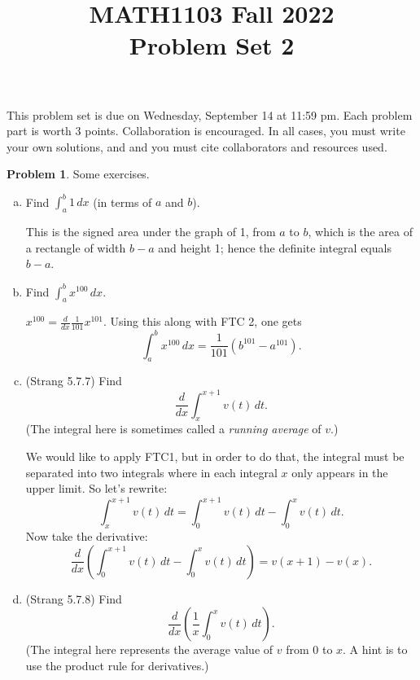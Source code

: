 \documentclass[11pt,oneside]{amsart}
\title{MATH1103 Fall 2022\\
Problem Set 2}
\theoremstyle{definition}
\newtheorem{problem}{Problem}
\begin{document}
    \maketitle
    This problem set is due on Wednesday, September 14 at 11:59 pm. Each problem part is worth 3 points. Collaboration is encouraged. In all cases, you must write your own solutions, and and you must cite collaborators and resources used.

    \begin{problem}
        Some exercises.
        \begin{enumerate}[(a)]
            \item Find $\int_a^b 1\,dx$ (in terms of $a$ and $b$).
            \begin{solution}
                This is the signed area under the graph of 1, from $a$ to $b$, which is the area of a rectangle of width $b-a$ and height 1; hence the definite integral equals $b-a$.
            \end{solution}
            \item Find $\int_a^b x^{100}\,dx$.
            \begin{solution}
                $x^{100}=\frac{d}{dx}\frac1{101}x^{101}$. Using this along with FTC 2, one gets
                \[\int_a^b x^{100}\,dx=\frac 1{101}(b^{101}-a^{101}).\]
            \end{solution}
            \item (Strang 5.7.7) Find
            \[\frac d{dx}\int_x^{x+1}v(t)\,dt.\]
            (The integral here is sometimes called a \emph{running average} of $v$.)
            \begin{solution}
                We would like to apply FTC1, but in order to do that, the integral must be separated into two integrals where in each integral $x$ only appears in the upper limit. So let's rewrite:
                \[
                    \int_x^{x+1}v(t)\,dt = \int_0^{x+1}v(t)\,dt -\int_0^x v(t)\,dt.
                \]
                Now take the derivative:
                \[\frac d{dx}\left(\int_0^{x+1}v(t)\,dt -\int_0^x v(t)\,dt\right)=v(x+1)-v(x).\]
            \end{solution}
            \item (Strang 5.7.8) Find
            \[\frac d{dx}\left(\frac 1x\int_0^x v(t)\,dt\right).\]
            (The integral here represents the average value of $v$ from 0 to $x$. A hint is to use the product rule for derivatives.)
            \begin{solution}
                \begin{align*}

\end{align*}
\end{solution}
\end{enumerate}
\end{problem}
\end{document}
